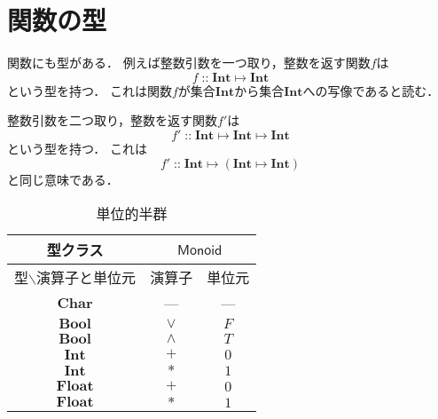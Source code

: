 \documentclass[twocolumn]{jsbook}
\newcommand{\hsklType}[1]{\textbf{#1}}
\newcommand{\hsklTypeclass}[1]{\mathsf{#1}}
\newcommand{\hsklBool}{\hsklType{Bool}}
\newcommand{\hsklChar}{\hsklType{Char}}
\newcommand{\hsklInt}{\hsklType{Int}}
\newcommand{\hsklFloat}{\hsklType{Float}}
\newcommand{\hsklMonoid}{\hsklTypeclass{Monoid}}
\DeclareMathOperator{\mathIn}{::}
\DeclareMathOperator{\mathMapsTo}{\mapsto}
\newcommand{\mathMorph}[2]{#1\mathMapsTo#2}
\newcommand{\mathMorphII}[3]{#1\mathMapsTo#2\mathMapsTo#3}
\newcommand{\mathMorphIIWithParenthesis}[3]{#1\mathMapsTo(#2\mathMapsTo#3)}
\begin{document}
\section{関数の型}

関数にも型がある．
例えば整数引数を一つ取り，整数を返す関数$f$は$$f\mathIn\mathMorph{\hsklInt}{\hsklInt}$$という型を持つ．
これは関数$f$が集合$\hsklInt$から集合$\hsklInt$への写像であると読む．

整数引数を二つ取り，整数を返す関数$f'$は$$f'\mathIn\mathMorphII{\hsklInt}{\hsklInt}{\hsklInt}$$という型を持つ．
これは$$f'\mathIn\mathMorphIIWithParenthesis{\hsklInt}{\hsklInt}{\hsklInt}$$と同じ意味である．

\begin{table}
\caption{単位的半群}
\label{tab:monoids}
\begin{center}
\begin{tabular}{||c||c|c||}
\hline
型クラス
    &\multicolumn{2}{|c||}{$\hsklMonoid$}\\
\hline\hline
型$\backslash$演算子と単位元
    &演算子
    &単位元\\
\hline
$\hsklChar$
    &---
    &---\\
\hline
$\hsklBool$
    &$\vee$
    &$F$\\
\hline
$\hsklBool$
    &$\wedge$
    &$T$\\
\hline
$\hsklInt$
    &$+$
    &$0$\\
\hline
$\hsklInt$
    &$*$
    &$1$\\
\hline
$\hsklFloat$
    &$+$
    &$0$\\
\hline
$\hsklFloat$
    &$*$
    &$1$\\
\hline
\end{tabular}
\end{center}
\end{table}
\end{document}
